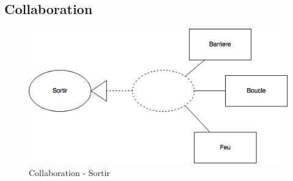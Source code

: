\subsection{Collaboration}
\begin{figure}[!htb]
    \centering
    \includegraphics[scale=0.6]{02_Desenvolvimento/TD2/images/ColaSortir.png}
    \caption{Collaboration - Sortir}
    \label{fig:DARentrer}
\end{figure}